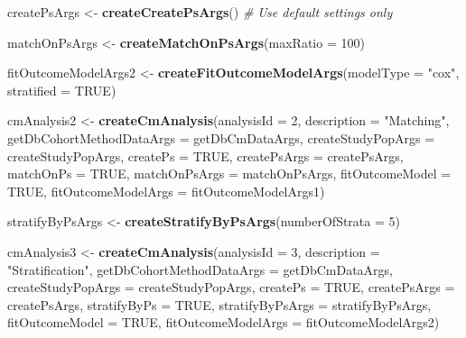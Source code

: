 \documentclass[
]{article}
\newenvironment{Shaded}{\begin{snugshade}}{\end{snugshade}}
\newcommand{\CommentTok}[1]{\textcolor[rgb]{0.56,0.35,0.01}{\textit{#1}}}
\newcommand{\DataTypeTok}[1]{\textcolor[rgb]{0.13,0.29,0.53}{#1}}
\newcommand{\DecValTok}[1]{\textcolor[rgb]{0.00,0.00,0.81}{#1}}
\newcommand{\KeywordTok}[1]{\textcolor[rgb]{0.13,0.29,0.53}{\textbf{#1}}}
\newcommand{\NormalTok}[1]{#1}
\newcommand{\OtherTok}[1]{\textcolor[rgb]{0.56,0.35,0.01}{#1}}
\newcommand{\StringTok}[1]{\textcolor[rgb]{0.31,0.60,0.02}{#1}}
\begin{document}
\begin{Shaded}
\begin{Highlighting}[]
\NormalTok{createPsArgs <-}\StringTok{ }\KeywordTok{createCreatePsArgs}\NormalTok{() }\CommentTok{# Use default settings only}

\NormalTok{matchOnPsArgs <-}\StringTok{ }\KeywordTok{createMatchOnPsArgs}\NormalTok{(}\DataTypeTok{maxRatio =} \DecValTok{100}\NormalTok{)}

\NormalTok{fitOutcomeModelArgs2 <-}\StringTok{ }\KeywordTok{createFitOutcomeModelArgs}\NormalTok{(}\DataTypeTok{modelType =} \StringTok{"cox"}\NormalTok{,}
                                                  \DataTypeTok{stratified =} \OtherTok{TRUE}\NormalTok{)}

\NormalTok{cmAnalysis2 <-}\StringTok{ }\KeywordTok{createCmAnalysis}\NormalTok{(}\DataTypeTok{analysisId =} \DecValTok{2}\NormalTok{,}
                                \DataTypeTok{description =} \StringTok{"Matching"}\NormalTok{,}
                                \DataTypeTok{getDbCohortMethodDataArgs =}\NormalTok{ getDbCmDataArgs,}
                                \DataTypeTok{createStudyPopArgs =}\NormalTok{ createStudyPopArgs,}
                                \DataTypeTok{createPs =} \OtherTok{TRUE}\NormalTok{,}
                                \DataTypeTok{createPsArgs =}\NormalTok{ createPsArgs,}
                                \DataTypeTok{matchOnPs =} \OtherTok{TRUE}\NormalTok{,}
                                \DataTypeTok{matchOnPsArgs =}\NormalTok{ matchOnPsArgs,}
                                \DataTypeTok{fitOutcomeModel =} \OtherTok{TRUE}\NormalTok{,}
                                \DataTypeTok{fitOutcomeModelArgs =}\NormalTok{ fitOutcomeModelArgs1)}

\NormalTok{stratifyByPsArgs <-}\StringTok{ }\KeywordTok{createStratifyByPsArgs}\NormalTok{(}\DataTypeTok{numberOfStrata =} \DecValTok{5}\NormalTok{)}

\NormalTok{cmAnalysis3 <-}\StringTok{ }\KeywordTok{createCmAnalysis}\NormalTok{(}\DataTypeTok{analysisId =} \DecValTok{3}\NormalTok{,}
                                \DataTypeTok{description =} \StringTok{"Stratification"}\NormalTok{,}
                                \DataTypeTok{getDbCohortMethodDataArgs =}\NormalTok{ getDbCmDataArgs,}
                                \DataTypeTok{createStudyPopArgs =}\NormalTok{ createStudyPopArgs,}
                                \DataTypeTok{createPs =} \OtherTok{TRUE}\NormalTok{,}
                                \DataTypeTok{createPsArgs =}\NormalTok{ createPsArgs,}
                                \DataTypeTok{stratifyByPs =} \OtherTok{TRUE}\NormalTok{,}
                                \DataTypeTok{stratifyByPsArgs =}\NormalTok{ stratifyByPsArgs,}
                                \DataTypeTok{fitOutcomeModel =} \OtherTok{TRUE}\NormalTok{,}
                                \DataTypeTok{fitOutcomeModelArgs =}\NormalTok{ fitOutcomeModelArgs2)}


\end{Highlighting}
\end{Shaded}
\end{document}
